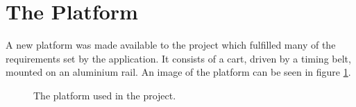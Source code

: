 \section{The Platform} %
\label{sec:the_platform}
A new platform was made available to the project which fulfilled many of the requirements set by the application.
It consists of a cart, driven by a timing belt, mounted on an aluminium rail.
An image of the platform can be seen in figure \ref{fig:platform}.

\begin{figure}[H]
 	\centering
 	\caption{The platform used in the project.}
 	\label{fig:platform}
 \end{figure} 
